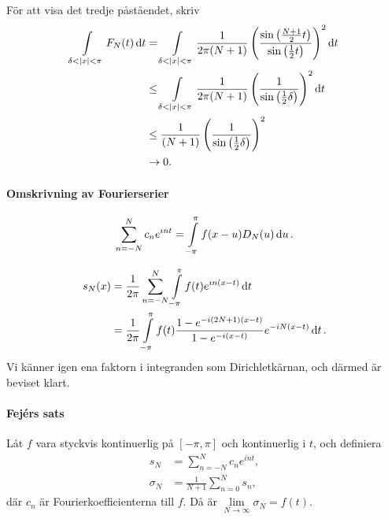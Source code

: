 För att visa det tredje påståendet, skriv
\begin{align*}
	\int\limits_{\delta < \abs{x} < \pi}^{}F_{N}(t)\dd{t} &= \int\limits_{\delta < \abs{x} < \pi}^{}\frac{1}{2\pi (N + 1)}\left(\frac{\sin{\left(\frac{N + 1}{2}t\right)}}{\sin{\left(\frac{1}{2}t\right)}}\right)^{2}\dd{t} \\
	                                                &\leq \int\limits_{\delta < \abs{x} < \pi}^{}\frac{1}{2\pi (N + 1)}\left(\frac{1}{\sin{\left(\frac{1}{2}\delta\right)}}\right)^{2}\dd{t} \\
	                                                &\leq \frac{1}{(N + 1)}\left(\frac{1}{\sin{\left(\frac{1}{2}\delta\right)}}\right)^{2} \\
	                                                &\to 0. 
\end{align*}

\paragraph{Omskrivning av Fourierserier}
\begin{align*}
	\sum\limits_{n = -N}^{N}c_{n}e^{int} = \int\limits_{-\pi}^{\pi}f(x - u)D_{N}(u)\dd{u}.
\end{align*}

\proof
\begin{align*}
	s_{N}(x) &= \frac{1}{2\pi}\sum\limits_{n = -N}^{N}\int\limits_{-\pi}^{\pi}f(t)e^{in(x - t)}\dd{t} \\
	         &= \frac{1}{2\pi}\int\limits_{-\pi}^{\pi}f(t)\frac{1 - e^{-i(2N + 1)(x - t)}}{1 - e^{-i(x - t)}}e^{-iN(x - t)}\dd{t}.
\end{align*}
Vi känner igen ena faktorn i integranden som Dirichletkärnan, och därmed är beviset klart.

\paragraph{Fejérs sats}
Låt $f$ vara styckvis kontinuerlig på $[-\pi, \pi]$ och kontinuerlig i $t$, och definiera
\begin{align*}
	s_{N}      &= \sum\limits_{n = -N}^{N}c_{n}e^{int}, \\
	\sigma_{N} &= \frac{1}{N + 1}\sum\limits_{n = 0}^{N}s_{n},
\end{align*}
där $c_{n}$ är Fourierkoefficienterna till $f$. Då är $\lim\limits_{N\to\infty}\sigma_{N} = f(t)$.

